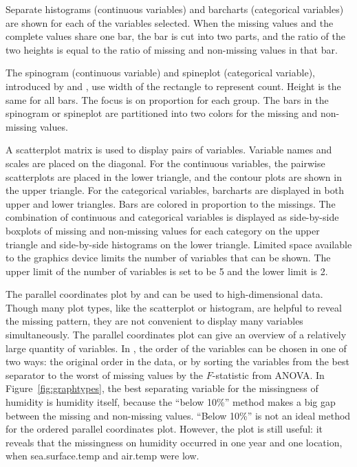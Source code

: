 \documentclass[article]{jss}
\begin{document}
Separate histograms (continuous variables) and barcharts
(categorical variables) are shown for each of the variables
selected. When the missing values and the complete values share
one bar, the bar is cut into two parts, and the ratio of the
two heights is equal to the ratio of missing and non-missing
values in that bar.

The spinogram (continuous variable) and spineplot (categorical variable),
introduced by \citet{hummel1996linked} and \citet{theus1999visualizing},
use width of the rectangle to represent count. Height is the
same for all bars. The focus is on proportion for each group.
The bars in the spinogram or spineplot are partitioned into two
colors for the missing and non-missing values.

A scatterplot matrix is used to display pairs of variables.
Variable names and scales are placed on the diagonal. For the
continuous variables, the pairwise scatterplots are placed in
the lower triangle, and the contour plots are shown in the upper
triangle. For the categorical variables, barcharts are displayed
in both upper and lower triangles. Bars are colored in proportion
to the missings. The combination of continuous and categorical
variables is displayed as side-by-side boxplots of missing and
non-missing values for each category on the upper triangle and
side-by-side histograms on the lower triangle. Limited space
available to the graphics device limits the number of variables
that can be shown. The upper limit of the number of variables
is set to be 5 and the lower limit is 2.

The parallel coordinates plot by \citet{inselberg1985plane} and
\citet{wegman1990hyperdimensional} can be used to high-dimensional
data. Though many plot types, like the scatterplot or histogram,
are helpful to reveal the missing pattern, they are not convenient
to display many variables simultaneously. The parallel coordinates
plot can give an overview of a relatively large quantity of
variables. In , the order of the variables
can be chosen in one of two ways: the original order in the data,
or by sorting the variables from the best separator to the worst
of missing values by the $F$-statistic from ANOVA. In
Figure~\ref{fig:graphtypes}, the best separating variable for
the missingness of humidity is humidity itself, because the
``below 10\%'' method makes a big gap between the missing and
non-missing values. ``Below 10\%'' is not an ideal method for
the ordered parallel coordinates plot. However, the plot is
still useful: it reveals that the missingness on humidity
occurred in one year and one location, when sea.surface.temp
and air.temp were low.
\end{document}
